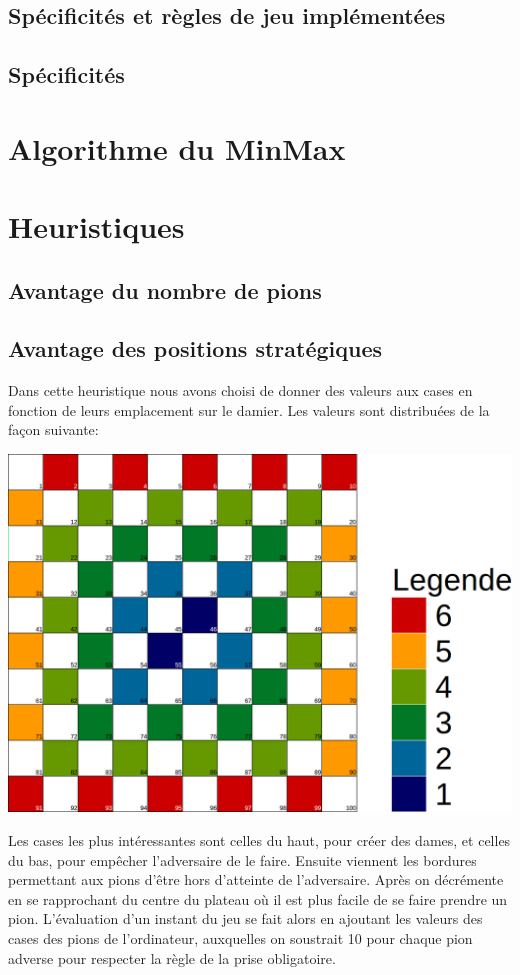 \documentclass[10pt,a4paper]{report}
\begin{document}
	\subsection{Spécificités et règles de jeu implémentées}
		\subsection{Spécificités}
\section{Algorithme du MinMax}

\section{Heuristiques}

	\subsection{Avantage du nombre de pions}

	\subsection{Avantage des positions stratégiques}
		Dans cette heuristique nous avons choisi de donner des valeurs aux cases en fonction de leurs emplacement sur le damier. Les valeurs sont distribuées de la façon suivante:
		\begin{center}
			\includegraphics[scale=0.2]{valeursDamier.png}
		\end{center}
		Les cases les plus intéressantes sont celles du haut, pour créer des dames, et celles du bas, pour empêcher l'adversaire de le faire. Ensuite viennent les bordures permettant aux pions d'être hors d'atteinte de l'adversaire. Après on décrémente en se rapprochant du centre du plateau où il est plus facile de se faire prendre un pion.
		L'évaluation d'un instant du jeu se fait alors en ajoutant les valeurs des cases des pions de l'ordinateur, auxquelles on soustrait 10 pour chaque pion adverse pour respecter la règle de la prise obligatoire.
\end{document}
